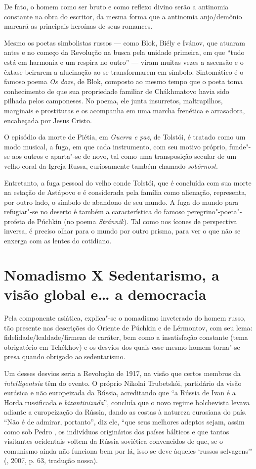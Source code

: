 De fato, o homem como ser bruto e como reflexo divino serão a antinomia constante na obra do escritor, da mesma forma que a antinomia anjo/demônio marcará as principais heroínas de seus romances.

Mesmo os poetas simbolistas russos --- como Blok, Biély e Ivánov, que atuaram antes e no começo da Revolução na busca pela unidade primeira, em que ``tudo está em harmonia e um respira no outro'' --- viram muitas vezes a ascensão e o êxtase beirarem a alucinação ao se transformarem em símbolo. Sintomático é o famoso poema \emph{Os doze}, de Blok, composto ao mesmo tempo que o poeta toma conhecimento de que sua propriedade familiar de Chákhmatovo havia sido pilhada pelos camponeses. No poema,
ele junta insurretos, maltrapilhos, marginais e prostitutas e os acompanha em uma marcha frenética e arrasadora, encabeçada por Jesus Cristo.

O episódio da morte de Piétia, em \emph{Guerra e paz}, de Tolstói, é tratado como um modo musical, a fuga, em que cada instrumento, com seu motivo próprio, funde"-se aos outros e aparta"-se de novo, tal como uma transposição secular de um velho coral da Igreja Russa, curiosamente também chamado \emph{sobórnost}.

Entretanto, a fuga pessoal do velho conde Tolstói, que é concluída com sua morte na estação de Astápovo e é considerada pela família como alienação, representa, por outro lado, o símbolo de abandono de seu mundo. A fuga do mundo para refugiar"-se no deserto é também a característica do famoso peregrino"-poeta"-profeta de Púchkin (no poema \emph{Stránnik}). Tal como nos ícones de perspectiva inversa, é preciso olhar para o mundo por outro prisma, para ver o que não se enxerga com as lentes do cotidiano.

\section{\uppercase{N}omadismo X \uppercase{S}edentarismo, a visão global e\ldots{} a democracia}

Pela componente asiática, explica"-se o nomadismo inveterado do homem russo, tão presente nas descrições do Oriente de Púchkin e de Lérmontov, com seu lema: fidelidade/lealdade/firmeza de caráter, bem como a insatisfação constante (tema obrigatório em Tchékhov) e os desvios dos quais esse mesmo homem torna"-se presa quando obrigado ao sedentarismo.

Um desses desvios seria a Revolução de 1917, na visão que certos membros da \emph{intelligentsia} têm do evento. O próprio Nikolai Trubetskói, partidário da visão eurásica e não europeizada da Rússia, acreditando que ``a Rússia de Ivan  é a Horda russificada e \emph{bizantinizada}'', concluía que o novo regime bolchevista levava adiante a europeização da Rússia, dando as costas à natureza eurasiana do país. ``Não é de admirar, portanto'', diz ele, ``que seus melhores adeptos sejam, assim como sob Pedro , os indivíduos originários dos países bálticos e que tantos visitantes ocidentais voltem da Rússia
soviética convencidos de que, se o comunismo ainda não funciona bem por lá, isso se deve àqueles `russos selvagens'" (, 2007, p. 63, tradução nossa).

